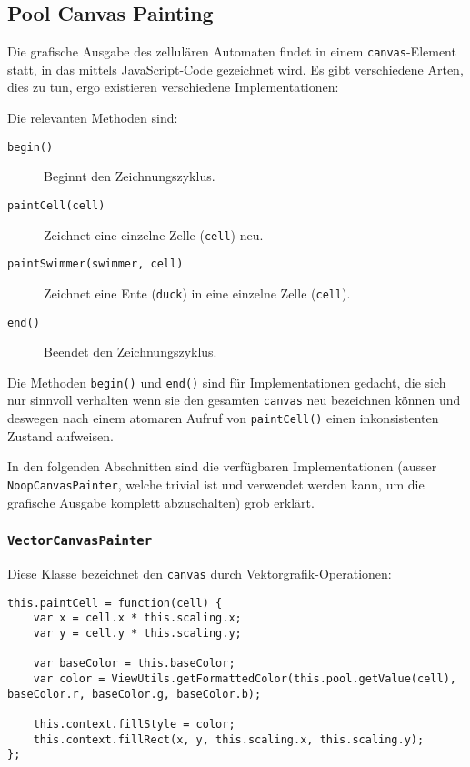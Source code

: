 \documentclass[11pt]{scrreprt} %
\theoremstyle{definition}
\begin{document}
\subsection{Pool Canvas Painting}

Die grafische Ausgabe des zellulären Automaten findet in einem {\tt canvas}-Element statt, in das mittels JavaScript-Code gezeichnet wird. Es gibt verschiedene Arten, dies zu tun, ergo existieren verschiedene Implementationen:


Die relevanten Methoden sind:

\begin{description}
\item[\tt begin()] Beginnt den Zeichnungszyklus.
\item[\tt paintCell(cell)] Zeichnet eine einzelne Zelle ({\tt cell}) neu.
\item[\tt paintSwimmer(swimmer, cell)] Zeichnet eine Ente ({\tt duck}) in eine einzelne Zelle ({\tt cell}).
\item[\tt end()] Beendet den Zeichnungszyklus.
\end{description}

Die Methoden {\tt begin()} und {\tt end()} sind für Implementationen gedacht, die sich nur sinnvoll verhalten wenn sie den gesamten {\tt canvas} neu bezeichnen können und deswegen nach einem atomaren Aufruf von {\tt paintCell()} einen inkonsistenten Zustand aufweisen.

In den folgenden Abschnitten sind die verfügbaren Implementationen (ausser {\tt NoopCanvasPainter}, welche trivial ist und verwendet werden kann, um die grafische Ausgabe komplett abzuschalten) grob erklärt. 

\subsubsection{{\tt VectorCanvasPainter}}

Diese Klasse bezeichnet den {\tt canvas} durch Vektorgrafik-Operationen:

\begin{lstlisting}
this.paintCell = function(cell) {
	var x = cell.x * this.scaling.x;
	var y = cell.y * this.scaling.y;
	
	var baseColor = this.baseColor;
	var color = ViewUtils.getFormattedColor(this.pool.getValue(cell), baseColor.r, baseColor.g, baseColor.b);
	
	this.context.fillStyle = color;
	this.context.fillRect(x, y, this.scaling.x, this.scaling.y);
};
\end{lstlisting}
\end{document}
